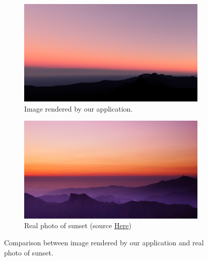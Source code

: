 \documentclass{ctuthesis}
\begin{document}
\begin{figure}[h]
    \centering
    \begin{subfigure}[b]{0.49\textwidth}
        \centering
        \includegraphics[width=\textwidth]{media/atmosphere_sunset.png}
        \caption{Image rendered by our application.}
        \label{fig:Render of sunset}
    \end{subfigure}
    \hfill
    \begin{subfigure}[b]{0.49\textwidth}
        \centering
        \includegraphics[width=\textwidth]{media/atmosphere_sunset_real.jpeg}
        \caption{Real photo of sunset (source \href{https://www.wallpapermaiden.com/wallpaper/39029/sunset-horizon-mountains-hills-clear-sky/download/1280x720}{Here})}
        \label{fig:Photo of sunset}
    \end{subfigure}
    \caption{Comparison between image rendered by our application and real photo of sunset.}
    \label{fig:Atmosphere sunset comparison}
\end{figure}
\end{document}
